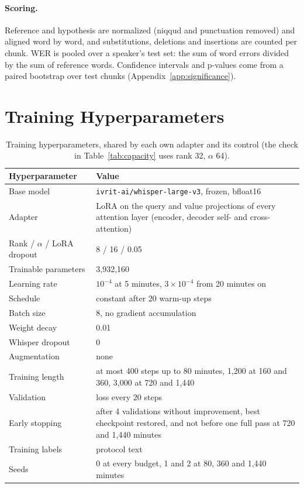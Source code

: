 \documentclass[11pt]{article}
\begin{document}
\paragraph{Scoring.}
Reference and hypothesis are normalized (niqqud and punctuation removed) and
aligned word by word, and substitutions, deletions and insertions are counted
per chunk. WER is pooled over a speaker's test set: the sum of word errors
divided by the sum of reference words. Confidence intervals and p-values come from
a paired bootstrap over test chunks (Appendix~\ref{app:significance}).


\section{Training Hyperparameters}
\label{app:training}


\begin{table}[!htbp]
\centering
\small
\begin{tabular}{lp{4.3cm}}
\toprule
Hyperparameter & Value \\
\midrule
Base model & \texttt{ivrit-ai/whisper-large-v3}, frozen, bfloat16 \\
Adapter & LoRA on the query and value projections of every attention layer (encoder, decoder self- and cross-attention) \\
Rank / $\alpha$ / LoRA dropout & 8 / 16 / 0.05 \\
Trainable parameters & 3{,}932{,}160 \\
Learning rate & $10^{-4}$ at 5 minutes, $3\times10^{-4}$ from 20 minutes on \\
Schedule & constant after 20 warm-up steps \\
Batch size & 8, no gradient accumulation \\
Weight decay & 0.01 \\
Whisper dropout & 0 \\
Augmentation & none \\
Training length & at most 400 steps up to 80 minutes, 1{,}200 at 160 and 360, 3{,}000 at 720 and 1{,}440 \\
Validation & loss every 20 steps \\
Early stopping & after 4 validations without improvement, best checkpoint restored, and not before one full pass at 720 and 1{,}440 minutes \\
Training labels & protocol text \\
Seeds & 0 at every budget, 1 and 2 at 80, 360 and 1{,}440 minutes \\
\bottomrule
\end{tabular}
\caption{Training hyperparameters, shared by each own adapter and its control (the check in Table~\ref{tab:capacity} uses rank 32, $\alpha$ 64).}
\label{tab:hyperparams}
\end{table}
\end{document}

